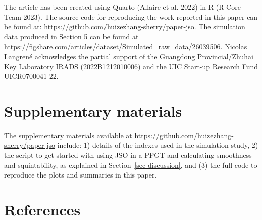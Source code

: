 \documentclass[
  12pt,
]{interact}
\theoremstyle{plain}
\begin{document}
The article has been created using Quarto (Allaire et al. 2022) in R (R
Core Team 2023). The source code for reproducing the work reported in
this paper can be found at:
\url{https://github.com/huizezhang-sherry/paper-jso}. The simulation
data produced in Section 5 can be found at
\url{https://figshare.com/articles/dataset/Simulated_raw_data/26039506}.
Nicolas Langrené acknowledges the partial support of the Guangdong
Provincial/Zhuhai Key Laboratory IRADS (2022B1212010006) and the UIC
Start-up Research Fund UICR0700041-22.

\section*{Supplementary materials}\label{supplementary-materials}

The supplementary materials available at
\url{https://github.com/huizezhang-sherry/paper-jso} include: 1) details
of the indexes used in the simulation study, 2) the script to get
started with using JSO in a PPGT and calculating smoothness and
squintability, as explained in Section~\ref{sec-discussion}, and (3) the
full code to reproduce the plots and summaries in this paper.

\section*{References}\label{references}
\end{document}
